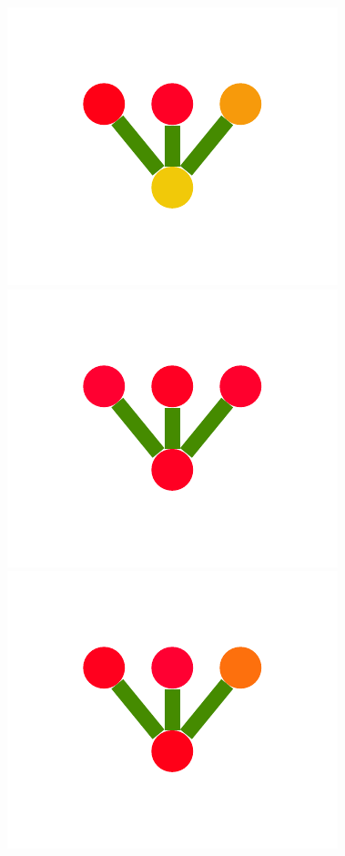 \documentclass[a4paper,10pt]{article}
\begin{document}
\begin{figure}
{    \includegraphics[scale=.26]{../figures/vector/4-2-2-mergeprog-bad-3.pdf}
    \includegraphics[scale=.26]{../figures/vector/4-2-2-mergeprog-bad-4.pdf}
    \includegraphics[scale=.26]{../figures/vector/4-2-2-mergeprog-bad-5.pdf}
}
\end{figure}
\end{document}
